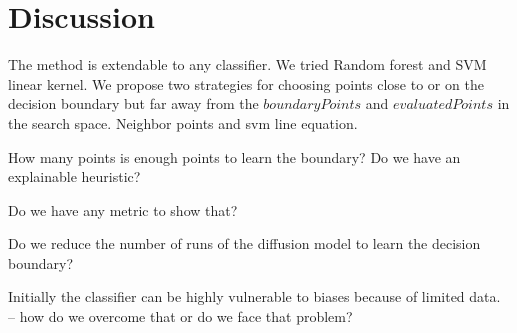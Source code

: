 \section{Discussion}

The method is extendable to any classifier. We tried Random forest and SVM linear kernel.
We propose two strategies for choosing points close to or on the decision boundary but far away from the $boundaryPoints$ and $evaluatedPoints$ in the search space. Neighbor points and svm line equation.

How many points is enough points to learn the boundary? Do we have an explainable heuristic?

Do we have any metric to show that?

Do we reduce the number of runs of the diffusion model to learn the decision boundary?


Initially the classifier can be highly vulnerable to biases because of limited data. -- how do we overcome that or do we face that problem?